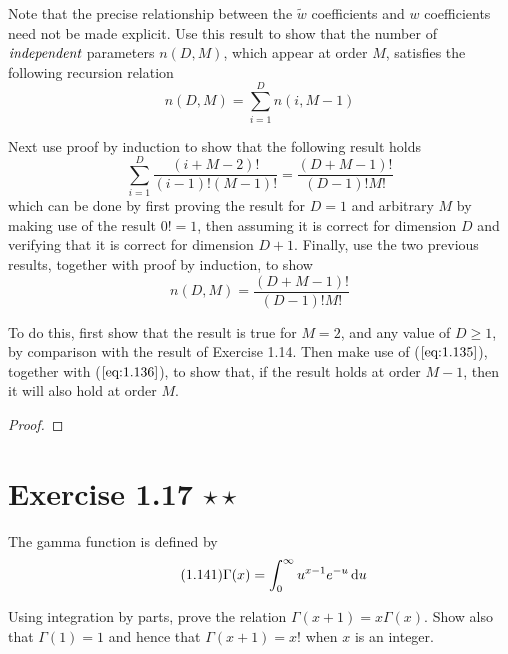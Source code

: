 Note that the precise relationship between the $\widetilde{w}$ coefficients and
 $w$ coefficients need not be made explicit. Use this result to show that the number
 of $\emph{independent}$ parameters $n(D, M)$, which appear at order $M$, satisfies
 the following recursion relation
 \begin{equation}\label{eq:1.135}\tag{1.135}
    n(D, M) = \sum_{i=1}^{D} n(i, M - 1) 
\end{equation}

Next use proof by induction to show that the following result holds
\begin{equation}\label{eq:1.136}\tag{1.136}
    \sum_{i=1}^{D} \frac{(i + M - 2)!}{(i - 1)!(M - 1)!} = \frac{(D + M - 1)!}{(D - 1)!M!}
\end{equation}
which can be done by first proving the result for $D = 1$ and arbitrary $M$ by
making use of the result $0! = 1$, then assuming it is correct for dimension $D$ 
and verifying that it is correct for dimension $D + 1$. Finally, use the two previous
results, together with proof by induction, to show
\begin{equation}\label{eq:1.137}\tag{1.137}
    n(D, M) = \frac{(D + M - 1)!}{(D - 1)!M!}
\end{equation}

To do this, first show that the result is true for $M = 2$, and any value of $D \geq 1$,
by comparison with the result of Exercise 1.14. Then make use of ($\ref{eq:1.135}$), together
with ($\ref{eq:1.136}$), to show that, if the result holds at order $M - 1$, then it will
also hold at order $M$.

\vspace{1em}

\begin{proof}
    
\end{proof}

\section*{Exercise 1.17 $\star \star$}
The gamma function is defined by 
\begin{equation}\label{eq:1.141}\tag{1.141}
    \Gamma(x) = \int_{0}^{\infty} u^{x - 1}e^{-u} \mathop{}\!\mathrm{d} u 
\end{equation}

Using integration by parts, prove the relation $\Gamma(x + 1) = x\Gamma(x)$. Show
also that $\Gamma(1) = 1$ and hence that $\Gamma(x + 1) = x!$ when $x$ is
an integer.

